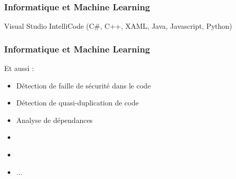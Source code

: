 \begin{frame}
  \frametitle{Informatique et Machine Learning}
  Visual Studio IntelliCode (C\#, C++, XAML, Java, Javascript, Python)
\end{frame}

\begin{frame}
  \frametitle{Informatique et Machine Learning}
  Et aussi :
  \begin{itemize}
  \item Détection de faille de sécurité dans le code
  \item Détection de quasi-duplication de code
  \item Analyse de dépendances
  \item \href{https://www.youtube.com/watch?v=ZD8Cnzc6KlY}{}
  \item \href{http://code2vec.org/}{}
  \item ...
  \end{itemize}
\end{frame}
